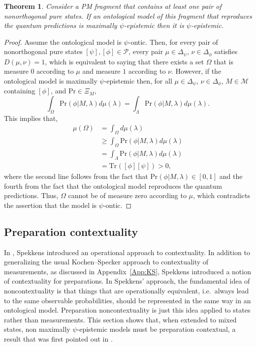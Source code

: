 \documentclass[DIV=calc,paper=a4,fontsize=11pt,twocolumn]{scrartcl} %
\theoremstyle{definition}
\theoremstyle{plain}
\newtheorem{theorem}[definition]{Theorem}
\newcommand{\Proj}[1]{\ensuremath{\left [ #1 \right ]}}
\newcommand{\Tr}[2][]{\ensuremath{\text{Tr}_{#1} \left ( #2 \right )}}
\begin{document}
\begin{theorem}
\label{thm:ME:MEPE}
Consider a PM fragment that contains at least one pair of
nonorthogonal pure states.  If an ontological model of this fragment
that reproduces the quantum predictions is maximally
$\psi$-epistemic then it is $\psi$-epistemic.
\end{theorem}
\begin{proof}
Assume the ontological model is $\psi$-ontic.  Then, for every pair
of nonorthogonal pure states $\Proj{\psi}, \Proj{\phi} \in
\mathcal{P}$, every pair $\mu \in \Delta_{\psi}$, $\nu \in
\Delta_{\phi}$ satisfies $D(\mu,\nu) = 1$, which is equivalent to
saying that there exists a set $\Omega$ that is measure $0$
according to $\mu$ and measure $1$ according to $\nu$.  However, if
the ontological model is maximally $\psi$-epistemic then, for all
$\mu \in \Delta_{\psi}$, $\nu \in \Delta_{\phi}$, $M \in
\mathcal{M}$ containing $\Proj{\phi}$, and $\text{Pr} \in \Xi_M$,
\begin{equation}
\int_{\Omega} \text{Pr}(\phi|M,\lambda) d\mu(\lambda) =
\int_{\Lambda} \text{Pr}(\phi|M,\lambda) d\mu(\lambda).
\end{equation}
This implies that,
\begin{align}
\mu(\Omega) & = \int_{\Omega} d\mu(\lambda) \\
& \geq \int_{\Omega}
\text{Pr}(\phi|M,\lambda) d \mu(\lambda) \\
& = \int_{\Lambda} \text{Pr}(\phi|M,\lambda) d \mu(\lambda) \\
& = \Tr{\Proj{\phi}\Proj{\psi}} > 0,
\end{align}
where the second line follows from the fact that
$\text{Pr}(\phi|M,\lambda) \in [0,1]$ and the fourth from the fact
that the ontological model reproduces the quantum predictions.
Thus, $\Omega$ cannot be of measure zero according to $\mu$, which
contradicts the assertion that the model is $\psi$-ontic.
\end{proof}

\subsection{Preparation contextuality}

\label{PC}

In \cite{Spekkens2005}, Spekkens introduced an operational approach to
contextuality.  In addition to generalizing the usual Kochen--Specker
approach to contextuality of measurements, as discussed in
Appendix~\ref{App:KS}, Spekkens introduced a notion of contextuality
for preparations.  In Spekkens' approach, the fundamental idea of
noncontextuality is that things that are operationally equivalent,
i.e.\ always lead to the same observable probabilities, should be
represented in the same way in an ontological model.  Preparation
noncontextuality is just this idea applied to states rather than
measurements.  This section shows that, when extended to mixed states,
non maximally $\psi$-epistemic models must be preparation contextual,
a result that was first pointed out in \cite{Leifer2013c}.
\end{document}
